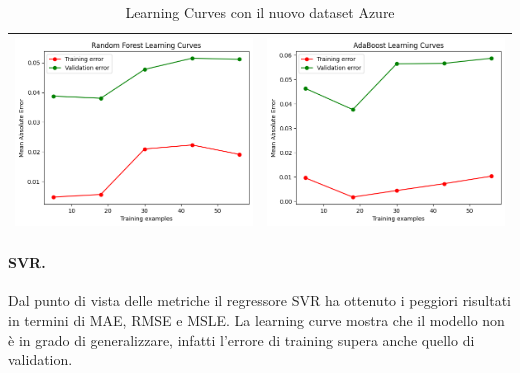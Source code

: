 \begin{table}[H]
\begin{tabularx}{\textwidth}{|X|X|}
        \includegraphics[width=\linewidth, trim=0 0 0 0]{images/RandomForestRegressor_lc70_Azure.png} &
        \includegraphics[width=\linewidth, trim=0 0 0 0]{images/AdaBoostRegressor_lc70_Azure.png} \\
        \hline
    \end{tabularx}
    \caption{Learning Curves con il nuovo dataset Azure}
    \label{tab:emissions_info}
\end{table}

\paragraph{\textbf{SVR}.}
Dal punto di vista delle metriche il regressore SVR ha ottenuto i peggiori risultati in termini di MAE, RMSE e MSLE. La learning curve mostra che il modello non è in grado di generalizzare, infatti l'errore di training supera anche quello di validation.

